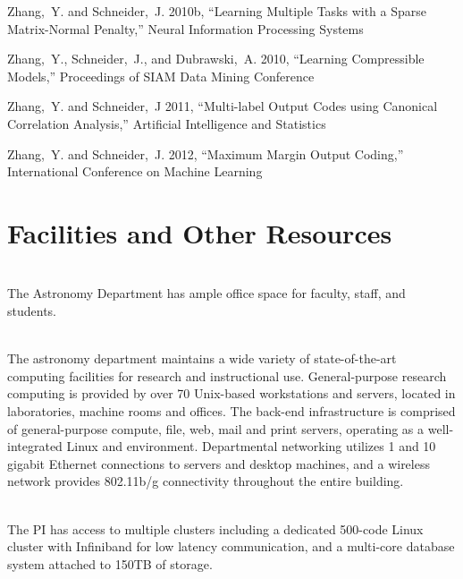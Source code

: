 \documentclass[useAMS,usenatbib,tightenlines,11pt,preprint]{aastex}
\begin{document}
\begin{thebibliography}{99}
Zhang,~Y. and Schneider,~J. 2010b,
``Learning Multiple Tasks with a Sparse Matrix-Normal Penalty,''
Neural Information Processing Systems

Zhang,~Y., Schneider,~J., and Dubrawski,~A. 2010,
``Learning Compressible Models,'' Proceedings of SIAM Data Mining Conference

Zhang,~Y. and Schneider,~J 2011, ``Multi-label Output Codes using Canonical Correlation
Analysis,'' Artificial Intelligence and Statistics

Zhang,~Y. and Schneider,~J. 2012, ``Maximum Margin Output Coding,''
International Conference on Machine Learning

\end{thebibliography} 

\newpage

\section*{Facilities and Other Resources}

\\
The Astronomy Department has ample office
space for faculty, staff, and students. 

\\
The astronomy department maintains a wide variety of state-of-the-art
computing facilities for research and instructional use. General-purpose research computing is provided by over 70 
Unix-based workstations and servers, located in laboratories, machine rooms and offices. The
back-end infrastructure is comprised of general-purpose compute, file, web, mail and print
servers, operating as a well-integrated Linux and environment. Departmental
networking utilizes 1 and 10 gigabit Ethernet connections to servers and desktop machines, and a
wireless network provides 802.11b/g connectivity throughout the entire building.

\\
The PI has  access to multiple clusters including a dedicated 500-code Linux cluster with Infiniband for low latency
communication, and a multi-core database system attached to 150TB of
storage. 


\label{lastpage}
\end{document}
